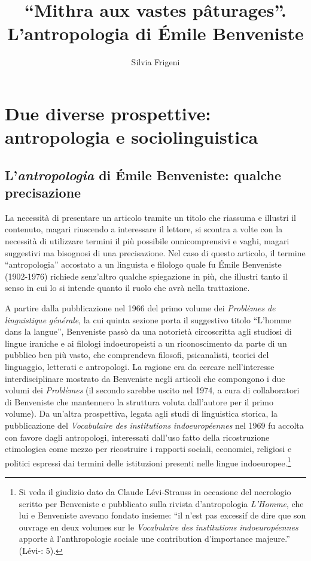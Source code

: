 \documentclass[output=paper]{langsci/langscibook}
\author{Silvia Frigeni\affiliation{Sapienza Università di Roma, Université Sorbonne Nouvelle -- Paris 3}\orcid{}}
\title{“Mithra aux vastes pâturages”. L’antropologia di Émile Benveniste}
\begin{document}
\maketitle

\section{Due diverse prospettive: antropologia e sociolinguistica} 

\subsection{L’\textit{antropologia} di Émile Benveniste: qualche precisazione}

La necessità di presentare un articolo tramite un titolo che riassuma e illustri il contenuto, magari riuscendo a interessare il lettore, si scontra a volte con la necessità di utilizzare termini il più possibile onnicomprensivi e vaghi, magari suggestivi ma bisognosi di una precisazione. Nel caso di questo articolo, il termine “antropologia” accostato a un linguista e filologo quale fu Émile Benveniste (1902-1976) richiede senz’altro qualche spiegazione in più, che illustri tanto il senso in cui lo si intende quanto il ruolo che avrà nella trattazione. 

A partire dalla pubblicazione nel 1966 del primo volume dei \textit{Problèmes} \textit{de} \textit{linguistique} \textit{générale}, la cui quinta sezione porta il suggestivo titolo “L’homme dans la langue”, Benveniste passò da una notorietà circoscritta agli studiosi di lingue iraniche e ai filologi indoeuropeisti a un riconoscimento da parte di un pubblico ben più vasto, che comprendeva filosofi, psicanalisti, teorici del linguaggio, letterati e antropologi. La ragione era da cercare nell’interesse interdisciplinare mostrato da Benveniste negli articoli che compongono i due volumi dei \textit{Problèmes} (il secondo sarebbe uscito nel 1974, a cura di collaboratori di Benveniste che mantennero la struttura voluta dall’autore per il primo volume). Da un’altra prospettiva, legata agli studi di linguistica storica, la pubblicazione del \textit{Vocabulaire} \textit{des} \textit{institutions} \textit{indoeuropéennes} nel 1969 fu accolta con favore dagli antropologi, interessati dall’uso fatto della ricostruzione etimologica come mezzo per ricostruire i rapporti sociali, economici, religiosi e politici espressi dai termini delle istituzioni presenti nelle lingue indoeuropee.\footnote{ \textrm{Si veda il giudizio dato da Claude Lévi-Strauss in occasione del necrologio scritto per Benveniste e pubblicato sulla rivista d'antropologia} \textrm{\textit{L’Homme}}\textrm{, che lui e Benveniste avevano fondato insieme:} \textrm{“}\textrm{il n’est pas excessif de dire que son ouvrage en deux volumes sur le} \textrm{\textit{Vocabulaire} \textit{des} \textit{institutions} \textit{indoeuropéennes}} \textrm{apporte à l’anthropologie sociale une contribution d’importance majeure.}\textrm{”} \textrm{(Lévi-\citealt{Strauss1976}: 5).}}
\end{document}
